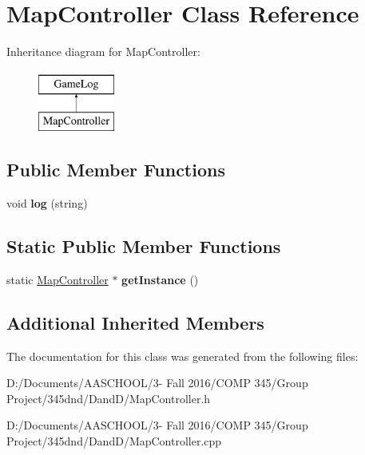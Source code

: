 \hypertarget{class_map_controller}{}\section{Map\+Controller Class Reference}
\label{class_map_controller}
Inheritance diagram for Map\+Controller\+:\begin{figure}[H]
\begin{center}
\leavevmode
\includegraphics[height=2.000000cm]{class_map_controller}
\end{center}
\end{figure}
\subsection*{Public Member Functions}
\begin{DoxyCompactItemize}
\item 
\hypertarget{class_map_controller_a98356b18fb02ff375ca534d03273f7a4}{}\label{class_map_controller_a98356b18fb02ff375ca534d03273f7a4} 
void {\bfseries log} (string)
\end{DoxyCompactItemize}
\subsection*{Static Public Member Functions}
\begin{DoxyCompactItemize}
\item 
\hypertarget{class_map_controller_a7a0247c773df06de2bc2ff3f7c5bb49f}{}\label{class_map_controller_a7a0247c773df06de2bc2ff3f7c5bb49f} 
static \hyperlink{class_map_controller}{Map\+Controller} $\ast$ {\bfseries get\+Instance} ()
\end{DoxyCompactItemize}
\subsection*{Additional Inherited Members}


The documentation for this class was generated from the following files\+:\begin{DoxyCompactItemize}
\item 
D\+:/\+Documents/\+A\+A\+S\+C\+H\+O\+O\+L/3-\/ Fall 2016/\+C\+O\+M\+P 345/\+Group Project/345dnd/\+Dand\+D/Map\+Controller.\+h\item 
D\+:/\+Documents/\+A\+A\+S\+C\+H\+O\+O\+L/3-\/ Fall 2016/\+C\+O\+M\+P 345/\+Group Project/345dnd/\+Dand\+D/Map\+Controller.\+cpp\end{DoxyCompactItemize}
